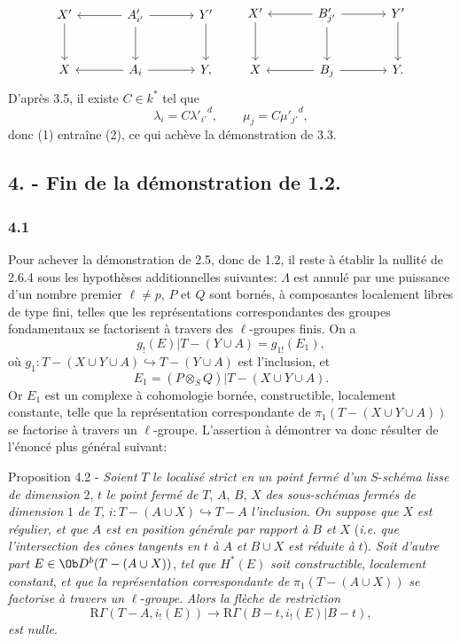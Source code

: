 \[
\begin{tikzcd}[column sep=large,row sep=large]
X' \arrow[d] & A'_{i'} \arrow[l] \arrow[r] \arrow[d] & Y' \arrow[d]\\
X & A_i \arrow[l] \arrow[r] & Y ,
\end{tikzcd}
\qquad
\begin{tikzcd}[column sep=large,row sep=large]
X' \arrow[d] & B'_{j'} \arrow[l] \arrow[r] \arrow[d] & Y' \arrow[d]\\
X & B_j \arrow[l] \arrow[r] & Y .
\end{tikzcd}
\]
D'après 3.5, il existe $C\in k^*$ tel que
\[
\lambda_i=C{\lambda'_{i'}}^d,\qquad
\mu_j=C{\mu'_{j'}}^d,
\]
donc (1) entraîne (2), ce qui achève la démonstration de 3.3.

\subsection*{4. - Fin de la démonstration de 1.2.}

\subsubsection*{4.1}
Pour achever la démonstration de 2.5, donc de 1.2, il reste à établir la nullité de 2.6.4 sous les hypothèses additionnelles suivantes: $\Lambda$ est annulé par une puissance d'un nombre premier $\ell\ne p$, $P$ et $Q$ sont bornés, à composantes localement libres de type fini, telles que les représentations correspondantes des groupes fondamentaux se factorisent à travers des $\ell$-groupes finis. On a
\[
g_!(E)|T-(Y\cup A)=g_{1!}(E_1),
\]
où $g_1:T-(X\cup Y\cup A)\hookrightarrow T-(Y\cup A)$ est l'inclusion, et
\[
E_1=(P\otimes_S Q)|T-(X\cup Y\cup A).
\]
Or $E_1$ est un complexe à cohomologie bornée, constructible, localement constante, telle que la représentation correspondante de $\pi_1(T-(X\cup Y\cup A))$ se factorise à travers un $\ell$-groupe. L'assertion à démontrer va donc résulter de l'énoncé plus général suivant:

\begin{statement}{Proposition 4.2 -}
\emph{Soient} $T$ \emph{le localisé strict en un point fermé d'un} $S$-\emph{schéma lisse de dimension} $2$, $t$ \emph{le point fermé de} $T$, $A$, $B$, $X$ \emph{des sous-schémas fermés de dimension} $1$ \emph{de} $T$, $i:T-(A\cup X)\hookrightarrow T-A$ \emph{l'inclusion}. \emph{On suppose que} $X$ \emph{est régulier}, \emph{et que} $A$ \emph{est en position générale par rapport à} $B$ \emph{et} $X$ (\emph{i.e. que l'intersection des cônes tangents en} $t$ \emph{à} $A$ \emph{et} $B\cup X$ \emph{est réduite à} $t$). \emph{Soit d'autre part} $E\in\Ob D^b(T-(A\cup X))$, \emph{tel que} $H^*(E)$ \emph{soit constructible}, \emph{localement constant}, \emph{et que la représentation correspondante de} $\pi_1(T-(A\cup X))$ \emph{se factorise à travers un} $\ell$-\emph{groupe}. \emph{Alors la flèche de restriction}
\[
\mathrm{R}\Gamma(T-A,i_!(E))
\longrightarrow
\mathrm{R}\Gamma(B-t,i_!(E)|B-t),
\]
\emph{est nulle}.
\end{statement}

